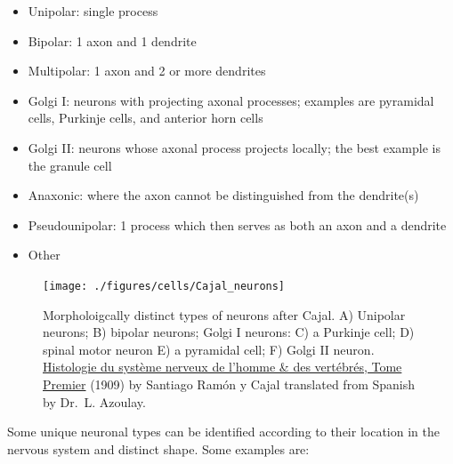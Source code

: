 \begin{itemize}
\tightlist
\item
  Unipolar: single process
\item
  Bipolar: 1 axon and 1 dendrite
\item
  Multipolar: 1 axon and 2 or more dendrites
\item
  Golgi I: neurons with projecting axonal processes; examples are pyramidal cells, Purkinje cells, and anterior horn cells
\item
  Golgi II: neurons whose axonal process projects locally; the best example is the granule cell
\item
  Anaxonic: where the axon cannot be distinguished from the dendrite(s)
\item
  Pseudounipolar: 1 process which then serves as both an axon and a dendrite
\item
  Other
\end{itemize}



\begin{figure}

{\centering \texttt{[image: ./figures/cells/Cajal\_neurons]} 

}

\caption{Morpholoigcally distinct types of neurons after Cajal. A) Unipolar neurons; B) bipolar neurons; Golgi I neurons: C) a Purkinje cell; D) spinal motor neuron E) a pyramidal cell; F) Golgi II neuron. \href{https://wellcomelibrary.org/item/b2129592x\#?c=0\&m=0\&s=0\&cv=14\&z=0\%2C-3.48\%2C1\%2C8.6591}{Histologie du système nerveux de l'homme \& des vertébrés, Tome Premier} (1909) by Santiago Ramón y Cajal translated from Spanish by Dr.~L. Azoulay.}\label{fig:neurontypes}
\end{figure}

Some unique neuronal types can be identified according to their location in the nervous system and distinct shape. Some examples are:

